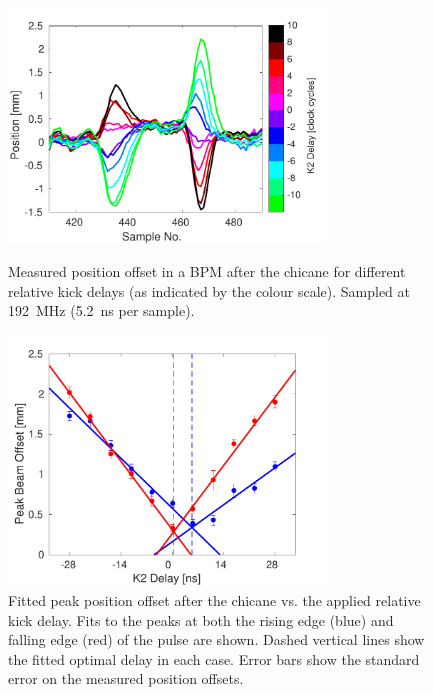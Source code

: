 \begin{figure}
  \centering
  \includegraphics[width=0.75\textwidth]{Figures/commissioning/relDelay_traces}
  \caption{Measured position offset in a BPM after the chicane for different relative kick delays (as indicated by the colour scale). Sampled at 192~MHz (5.2~ns per sample).}
  \label{f:relDelay_traces}

  \includegraphics[width=0.75\textwidth]{Figures/commissioning/relDelay_fit}
  \caption{Fitted peak position offset after the chicane vs. the applied relative kick delay. Fits to the peaks at both the rising edge (blue) and falling edge (red) of the pulse are shown. Dashed vertical lines show the fitted optimal delay in each case. Error bars show the standard error on the measured position offsets.}
  \label{f:relDelay_fit}
\end{figure}


